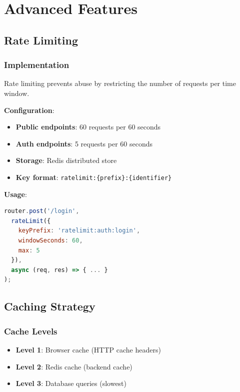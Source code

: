 \documentclass[12pt,a4paper]{report}
\begin{document}
\newpage

\chapter{Advanced Features}

\section{Rate Limiting}

\subsection{Implementation}

Rate limiting prevents abuse by restricting the number of requests per time window.

\textbf{Configuration}:
\begin{itemize}
    \item \textbf{Public endpoints}: 60 requests per 60 seconds
    \item \textbf{Auth endpoints}: 5 requests per 60 seconds
    \item \textbf{Storage}: Redis distributed store
    \item \textbf{Key format}: \texttt{ratelimit:\{prefix\}:\{identifier\}}
\end{itemize}

\textbf{Usage}:
\begin{lstlisting}[language=javascript, caption=Rate Limiting Middleware]
router.post('/login', 
  rateLimit({ 
    keyPrefix: 'ratelimit:auth:login', 
    windowSeconds: 60, 
    max: 5 
  }), 
  async (req, res) => { ... }
);
\end{lstlisting}

\section{Caching Strategy}

\subsection{Cache Levels}

\begin{itemize}
    \item \textbf{Level 1}: Browser cache (HTTP cache headers)
    \item \textbf{Level 2}: Redis cache (backend cache)
    \item \textbf{Level 3}: Database queries (slowest)
\end{itemize}
\end{document}
